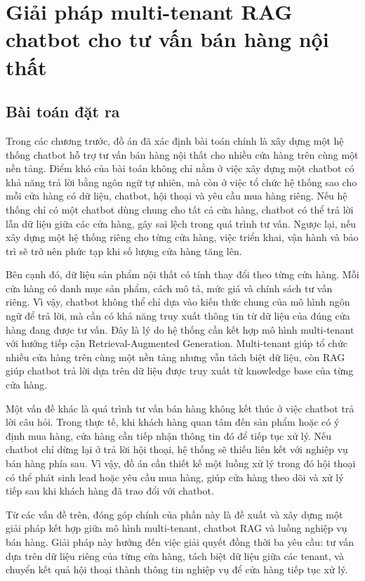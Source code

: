 \documentclass[../DoAn.tex]{subfiles}
\begin{document}
\section{Giải pháp multi-tenant RAG chatbot cho tư vấn bán hàng nội thất}
\label{section:5.1}

\subsection{Bài toán đặt ra}
\label{subsection:5.1.1}

Trong các chương trước, đồ án đã xác định bài toán chính là xây dựng một hệ thống chatbot hỗ trợ tư vấn bán hàng nội thất cho nhiều cửa hàng trên cùng một nền tảng. Điểm khó của bài toán không chỉ nằm ở việc xây dựng một chatbot có khả năng trả lời bằng ngôn ngữ tự nhiên, mà còn ở việc tổ chức hệ thống sao cho mỗi cửa hàng có dữ liệu, chatbot, hội thoại và yêu cầu mua hàng riêng. Nếu hệ thống chỉ có một chatbot dùng chung cho tất cả cửa hàng, chatbot có thể trả lời lẫn dữ liệu giữa các cửa hàng, gây sai lệch trong quá trình tư vấn. Ngược lại, nếu xây dựng một hệ thống riêng cho từng cửa hàng, việc triển khai, vận hành và bảo trì sẽ trở nên phức tạp khi số lượng cửa hàng tăng lên.

Bên cạnh đó, dữ liệu sản phẩm nội thất có tính thay đổi theo từng cửa hàng. Mỗi cửa hàng có danh mục sản phẩm, cách mô tả, mức giá và chính sách tư vấn riêng. Vì vậy, chatbot không thể chỉ dựa vào kiến thức chung của mô hình ngôn ngữ để trả lời, mà cần có khả năng truy xuất thông tin từ dữ liệu của đúng cửa hàng đang được tư vấn. Đây là lý do hệ thống cần kết hợp mô hình multi-tenant với hướng tiếp cận Retrieval-Augmented Generation. Multi-tenant giúp tổ chức nhiều cửa hàng trên cùng một nền tảng nhưng vẫn tách biệt dữ liệu, còn RAG giúp chatbot trả lời dựa trên dữ liệu được truy xuất từ knowledge base của từng cửa hàng.

Một vấn đề khác là quá trình tư vấn bán hàng không kết thúc ở việc chatbot trả lời câu hỏi. Trong thực tế, khi khách hàng quan tâm đến sản phẩm hoặc có ý định mua hàng, cửa hàng cần tiếp nhận thông tin đó để tiếp tục xử lý. Nếu chatbot chỉ dừng lại ở trả lời hội thoại, hệ thống sẽ thiếu liên kết với nghiệp vụ bán hàng phía sau. Vì vậy, đồ án cần thiết kế một luồng xử lý trong đó hội thoại có thể phát sinh lead hoặc yêu cầu mua hàng, giúp cửa hàng theo dõi và xử lý tiếp sau khi khách hàng đã trao đổi với chatbot.

Từ các vấn đề trên, đóng góp chính của phần này là đề xuất và xây dựng một giải pháp kết hợp giữa mô hình multi-tenant, chatbot RAG và luồng nghiệp vụ bán hàng. Giải pháp này hướng đến việc giải quyết đồng thời ba yêu cầu: tư vấn dựa trên dữ liệu riêng của từng cửa hàng, tách biệt dữ liệu giữa các tenant, và chuyển kết quả hội thoại thành thông tin nghiệp vụ để cửa hàng tiếp tục xử lý.
\end{document}
